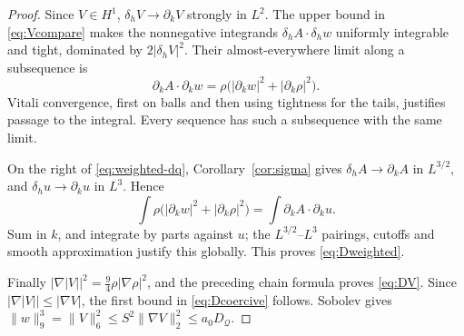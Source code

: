 \documentclass[11pt,a4paper]{article}
\theoremstyle{definition}
\theoremstyle{remark}
\newcommand{\Q}{\mathcal Q}
\newcommand{\norm}[1]{\lVert #1\rVert}
\numberwithin{equation}{section}
\begin{document}
\begin{proof}
Since \(V\in H^1\), \(\delta_hV\to\partial_kV\) strongly in \(L^2\). The upper bound in \eqref{eq:Vcompare} makes the nonnegative integrands \(\delta_hA\cdot\delta_hw\) uniformly integrable and tight, dominated by \(2|\delta_hV|^2\). Their almost-everywhere limit along a subsequence is
\[
\partial_kA\cdot\partial_kw
=\rho\bigl(|\partial_kw|^2+|\partial_k\rho|^2\bigr).
\]
Vitali convergence, first on balls and then using tightness for the tails, justifies passage to the integral. Every sequence has such a subsequence with the same limit.

On the right of \eqref{eq:weighted-dq}, Corollary~\ref{cor:sigma} gives \(\delta_hA\to\partial_kA\) in \(L^{3/2}\), and \(\delta_hu\to\partial_ku\) in \(L^3\). Hence
\[
\int\rho\bigl(|\partial_kw|^2+|\partial_k\rho|^2\bigr)
=\int\partial_kA\cdot\partial_ku.
\]
Sum in \(k\), and integrate by parts against \(u\); the \(L^{3/2}\)--\(L^3\) pairings, cutoffs and smooth approximation justify this globally. This proves \eqref{eq:Dweighted}.

Finally \(|\nabla|V||^2=\frac94\rho|\nabla\rho|^2\), and the preceding chain formula proves \eqref{eq:DV}. Since \(|\nabla|V||\le|\nabla V|\), the first bound in \eqref{eq:Dcoercive} follows. Sobolev gives
\(\norm w_9^3=\norm V_6^2\le S^2\norm{\nabla V}_2^2\le a_0D_{\Q}\).
\end{proof}
\end{document}
